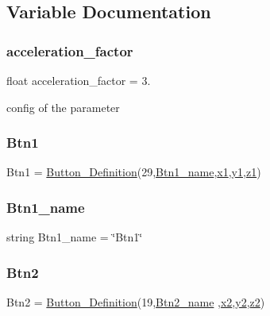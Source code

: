 \subsection{Variable Documentation}
\mbox{\label{a00025_a425bc201cf7b10f0c4f1068f752e7c9b}} 
\subsubsection{\texorpdfstring{acceleration\+\_\+factor}{acceleration\_factor}}
{\footnotesize\ttfamily float acceleration\+\_\+factor = 3.}



config of the parameter 

\mbox{\label{a00025_af037c6b9ff0314103d8127acc9d07e0b}} 
\subsubsection{\texorpdfstring{Btn1}{Btn1}}
{\footnotesize\ttfamily Btn1 = \hyperlink{a00053}{Button\+\_\+\+Definition}(29,\hyperlink{a00025_a96d98afcb35718dbc4c13c5bf74cfd5b}{Btn1\+\_\+name},\hyperlink{a00025_a3389d8b95846602e8f94cc15f41e48e9}{x1},\hyperlink{a00025_a9fe80bf4738047a31d7c162807ed85f0}{y1},\hyperlink{a00025_a7da4886c0a2e03b8bb9ed62eb20efb78}{z1})}

\mbox{\label{a00025_a96d98afcb35718dbc4c13c5bf74cfd5b}} 
\subsubsection{\texorpdfstring{Btn1\+\_\+name}{Btn1\_name}}
{\footnotesize\ttfamily string Btn1\+\_\+name = \char`\"{}Btn1\char`\"{}}

\mbox{\label{a00025_a73afa8c52cebd94e1889df5fbe3bec66}} 
\subsubsection{\texorpdfstring{Btn2}{Btn2}}
{\footnotesize\ttfamily Btn2 = \hyperlink{a00053}{Button\+\_\+\+Definition}(19,\hyperlink{a00025_a9595d49d1fc79cce5a3f3af42cf8502a}{Btn2\+\_\+name} ,\hyperlink{a00025_a24d6ffb6e8780eef0c81cd97e3f4fdaf}{x2},\hyperlink{a00025_a07bcd014e69eddcf4243b2a961014eaf}{y2},\hyperlink{a00025_a55196b87940893e540ba636218f4eb07}{z2})}

